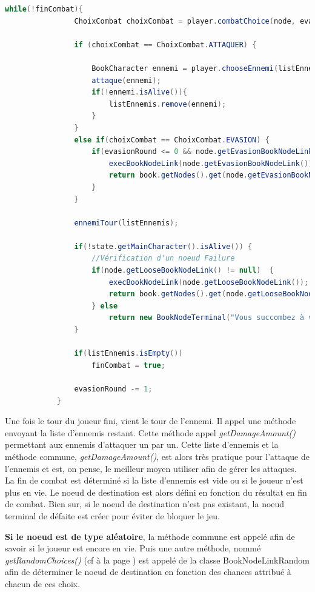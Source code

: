 		\begin{lstlisting}[gobble=12, language=java, caption=JeuCombat]
			while(!finCombat){
				ChoixCombat choixCombat = player.combatChoice(node, evasionRound, state);

				if (choixCombat == ChoixCombat.ATTAQUER) {

					BookCharacter ennemi = player.chooseEnnemi(listEnnemis);
					attaque(ennemi);
					if(!ennemi.isAlive()){
						listEnnemis.remove(ennemi);
					}
				}
				else if(choixCombat == ChoixCombat.EVASION) {
					if(evasionRound <= 0 && node.getEvasionBookNodeLink() != null){
						execBookNodeLink(node.getEvasionBookNodeLink());
						return book.getNodes().get(node.getEvasionBookNodeLink().getDestination());
					}
				}

				ennemiTour(listEnnemis);

				if(!state.getMainCharacter().isAlive()) {
					//Vérification d'un noeud Failure
					if(node.getLooseBookNodeLink() != null)  {
						execBookNodeLink(node.getLooseBookNodeLink());
						return book.getNodes().get(node.getLooseBookNodeLink().getDestination());
					} else
						return new BookNodeTerminal("Vous succombez à vos blessures", BookNodeStatus.FAILURE);
				}

				if(listEnnemis.isEmpty())
					finCombat = true;

				evasionRound -= 1;
			}
		\end{lstlisting}

		Une fois le tour du joueur fini, vient le tour de l'ennemi. Il appel une méthode envoyant la liste d'ennemis restant. Cette méthode appel \textit{getDamageAmount()} permettant aux ennemis d'attaquer un par un. Cette liste d'ennemis et la méthode commune, \textit{getDamageAmount()}, est alors très pratique pour l'attaque de l'ennemis et est, on pense, le meilleur moyen utiliser afin de gérer les attaques.\\

		La fin de combat est déterminé si la liste d'ennemis est vide ou si le joueur n'est plus en vie. Le noeud de destination est alors défini en fonction du résultat en fin de combat. Bien sur, si le noeud de destination n'est pas existant, la noeud terminal de défaite est créer pour éviter de bloquer le jeu.

		\textbf{Si le noeud est de type aléatoire}, la méthode commune est appelé afin de savoir si le joueur est encore en vie. Puis une autre méthode, nommé \textit{getRandomChoices()} (cf  à la page \pageref{lst:getRandomChoices}) est appelé de la classe BookNodeLinkRandom afin de déterminer le noeud de destination en fonction des chances attribué à chacun de ces choix.

